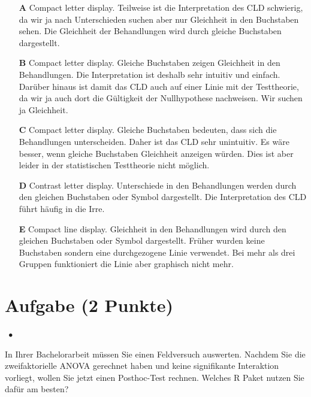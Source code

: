 \documentclass[a4paper, 9pt]{scrartcl}\usepackage[]{graphicx}\usepackage[]{xcolor}
\begin{document}
\begin{enumerate}
\item [\textbf{A} \msquare] Compact letter display. Teilweise ist die Interpretation des CLD schwierig, da wir ja nach Unterschieden suchen aber nur Gleichheit in den Buchstaben sehen. Die Gleichheit der Behandlungen wird durch gleiche Buchstaben dargestellt.
\item [\textbf{B} \msquare] Compact letter display. Gleiche Buchstaben zeigen Gleichheit in den Behandlungen. Die Interpretation ist deshalb sehr intuitiv und einfach. Darüber hinaus ist damit das CLD auch auf einer Linie mit der Testtheorie, da wir ja auch dort die Gültigkeit der Nullhypothese nachweisen. Wir suchen ja Gleichheit.
\item [\textbf{C} \msquare] Compact letter display. Gleiche Buchstaben bedeuten, dass sich die Behandlungen unterscheiden. Daher ist das CLD sehr unintuitiv. Es wäre besser, wenn gleiche Buchstaben Gleichheit anzeigen würden. Dies ist aber leider in der statistischen Testtheorie nicht möglich.
\item [\textbf{D} \msquare] Contrast letter display. Unterschiede in den Behandlungen werden durch den gleichen Buchstaben oder Symbol dargestellt. Die Interpretation des CLD führt häufig in die Irre.
\item [\textbf{E} \msquare] Compact line display. Gleichheit in den Behandlungen wird durch den gleichen Buchstaben oder Symbol dargestellt. Früher wurden keine Buchstaben sondern eine durchgezogene Linie verwendet. Bei mehr als drei Gruppen funktioniert die Linie aber graphisch nicht mehr.
\end{enumerate}

\section{Aufgabe \hfill (2 Punkte)}

\ifcollection
\begin{flushright}
\tiny\vspace{-2Ex}
\textbf{\examinhaltstart}
\exammodulestatversuch $\;\bullet$
\exammodulebiostat
\vspace{-1Ex}
\end{flushright}
\fi




In Ihrer Bachelorarbeit müssen Sie einen Feldversuch auswerten. Nachdem Sie die zweifaktorielle ANOVA gerechnet haben und keine signifikante Interaktion vorliegt, wollen Sie jetzt einen Posthoc-Test rechnen. Welches R Paket nutzen Sie dafür am besten?
\end{document}
